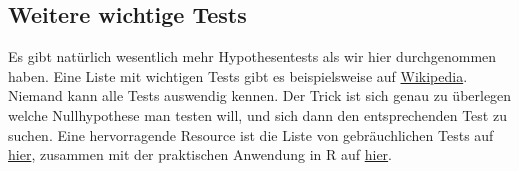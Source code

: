 \documentclass[a4paper,twoside]{tufte-book}\usepackage[]{graphicx}\usepackage[]{color}
\begin{document}
\subsection{Weitere wichtige Tests}

Es gibt natürlich wesentlich mehr Hypothesentests als wir hier durchgenommen haben. Eine Liste mit wichtigen Tests gibt es beispielsweise auf \href{http://en.wikipedia.org/wiki/Category:Statistical_tests}{Wikipedia}. Niemand kann alle Tests auswendig kennen. Der Trick ist sich genau zu überlegen welche Nullhypothese man testen will, und sich dann den entsprechenden Test zu suchen. Eine hervorragende Resource ist die Liste von gebräuchlichen Tests auf  \href{http://www.ats.ucla.edu/stat/mult_pkg/whatstat/}{hier}, zusammen mit der praktischen Anwendung in R auf \href{http://www.ats.ucla.edu/stat/r/whatstat/whatstat.htm}{hier}.
\end{document}

